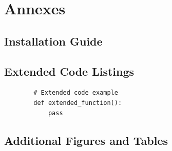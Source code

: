 
\chapter{Annexes}

\section{Installation Guide}

\lipsum[1]

\section{Extended Code Listings}

\lipsum[2]

\begin{listing}[H]
	\begin{verbatim}
        # Extended code example
        def extended_function():
            pass
    \end{verbatim}
	\caption{Extended code listing.}
	\label{lst:annex}
\end{listing}

\section{Additional Figures and Tables}

\lipsum[3]
